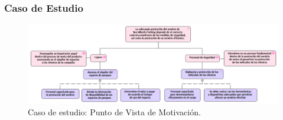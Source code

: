 \subsubsection{Caso de Estudio}


\begin{figure}[H]
	\centering
	\includegraphics[width=1.0\textwidth]{imagenes/Caso_Estudio/Motivacion/Motivacion.PDF}
	\caption{Caso de estudio: Punto de Vista de Motivación.}
	\label{fig:gap_analysis}
\end{figure}



